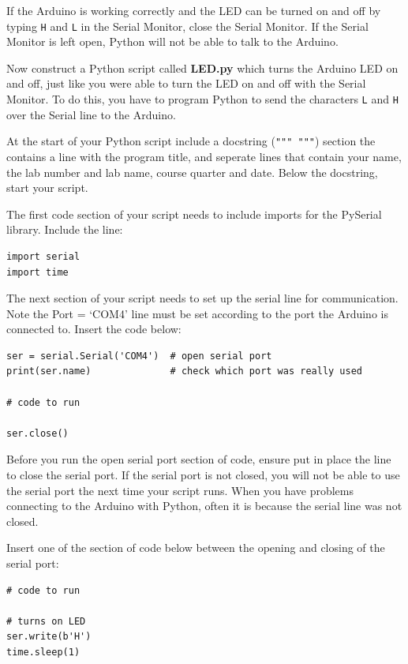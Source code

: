 \documentclass[11pt]{article}
\begin{document}
If the Arduino is working correctly and the LED can be turned on and off
by typing \texttt{H} and \texttt{L} in the Serial Monitor, close the
Serial Monitor. If the Serial Monitor is left open, Python will not be
able to talk to the Arduino.

Now construct a Python script called \textbf{LED.py} which turns the
Arduino LED on and off, just like you were able to turn the LED on and
off with the Serial Monitor. To do this, you have to program Python to
send the characters \texttt{L} and \texttt{H} over the Serial line to
the Arduino.

    At the start of your Python script include a docstring
(\texttt{"""\ """}) section the contains a line with the program title,
and seperate lines that contain your name, the lab number and lab name,
course quarter and date. Below the docstring, start your script.

The first code section of your script needs to include imports for the
PySerial library. Include the line:

\begin{verbatim}
import serial
import time
\end{verbatim}

The next section of your script needs to set up the serial line for
communication. Note the Port = `COM4' line must be set according to the
port the Arduino is connected to. Insert the code below:

\begin{verbatim}
ser = serial.Serial('COM4')  # open serial port
print(ser.name)              # check which port was really used

# code to run          

ser.close() 
\end{verbatim}

Before you run the open serial port section of code, ensure put in place
the line to close the serial port. If the serial port is not closed, you
will not be able to use the serial port the next time your script runs.
When you have problems connecting to the Arduino with Python, often it
is because the serial line was not closed.

Insert one of the section of code below between the opening and closing
of the serial port:

\begin{verbatim}
# code to run 

# turns on LED
ser.write(b'H')
time.sleep(1)
\end{verbatim}
\end{document}
